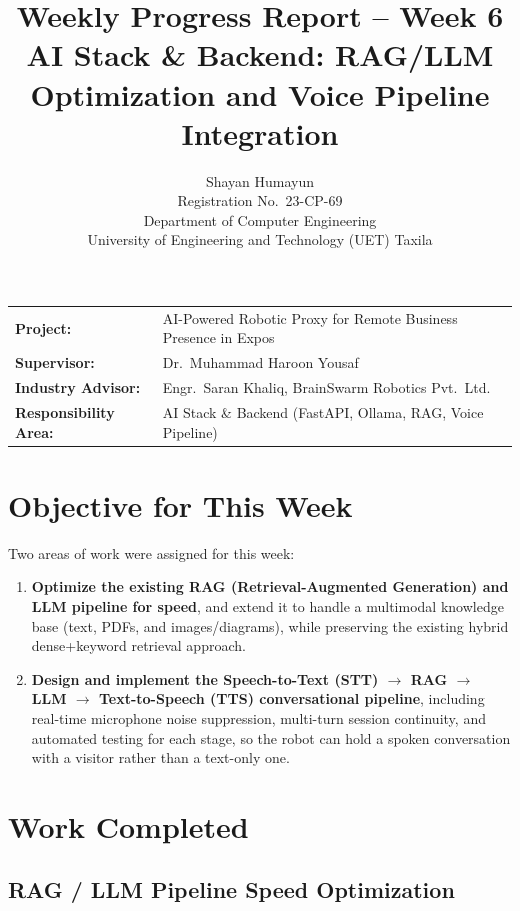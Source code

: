 \documentclass[11pt,a4paper]{article}
\title{\textbf{Weekly Progress Report -- Week 6} \\[4pt]
\large AI Stack \& Backend: RAG/LLM Optimization and Voice Pipeline Integration}
\author{Shayan Humayun \\ Registration No.\ 23-CP-69 \\ Department of Computer Engineering \\ University of Engineering and Technology (UET) Taxila}
\date{}
\begin{document}
\maketitle

\vspace{-1.5em}
\begin{center}
\begin{tabular}{ll}
\textbf{Project:} & AI-Powered Robotic Proxy for Remote Business Presence in Expos \\
\textbf{Supervisor:} & Dr.\ Muhammad Haroon Yousaf \\
\textbf{Industry Advisor:} & Engr.\ Saran Khaliq, BrainSwarm Robotics Pvt.\ Ltd. \\
\textbf{Responsibility Area:} & AI Stack \& Backend (FastAPI, Ollama, RAG, Voice Pipeline) \\
\end{tabular}
\end{center}

\vspace{1em}

\section{Objective for This Week}

Two areas of work were assigned for this week:

\begin{enumerate}
    \item \textbf{Optimize the existing RAG (Retrieval-Augmented Generation) and LLM pipeline for speed}, and extend it to handle a multimodal knowledge base (text, PDFs, and images/diagrams), while preserving the existing hybrid dense+keyword retrieval approach.
    \item \textbf{Design and implement the Speech-to-Text (STT) $\rightarrow$ RAG $\rightarrow$ LLM $\rightarrow$ Text-to-Speech (TTS) conversational pipeline}, including real-time microphone noise suppression, multi-turn session continuity, and automated testing for each stage, so the robot can hold a spoken conversation with a visitor rather than a text-only one.
\end{enumerate}

\section{Work Completed}

\subsection{RAG / LLM Pipeline Speed Optimization}
\end{document}
